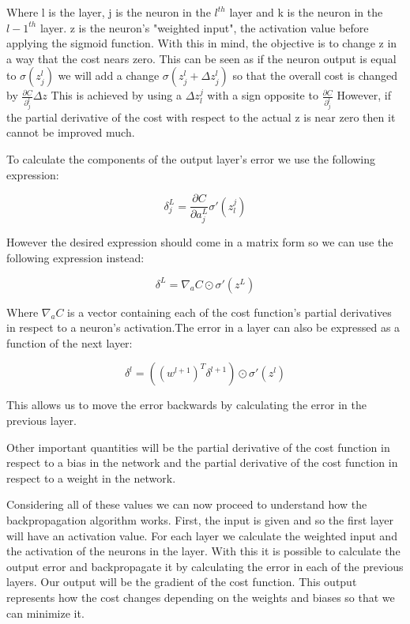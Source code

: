 \documentclass[a4paper, 12pt]{amsart}
\begin{document}
Where l is the layer, j is the neuron in the $l^{th}$ layer and k is the neuron
in the $l-1^{th}$ layer. z is the neuron's "weighted input", the activation value before applying the sigmoid function. With this in mind, the objective is to change z in a way that the cost nears zero. This can be seen as if the neuron output is equal to $\sigma(z_j^l)$  we will add a change $\sigma(z_j^l + \Delta z_j^l)$ so that the overall cost is changed by $\frac{\partial C}{\partial_j^l}\Delta z$ This is achieved by using a $\Delta z_l^j$ with a sign opposite to $\frac{\partial C}{\partial_j^l}$ However, if the partial derivative of the cost with respect to the actual z is near zero then it cannot be improved much. 

To calculate the components of the output layer's error we use the following expression:

\[\delta^L_j = \frac{\partial C}{\partial a^L_j}\sigma '(z^j_l)\]

However the desired expression should come in a matrix form so we can use the following expression instead:

\[\delta^L = \nabla_a C \odot \sigma '(z^L)\]

Where $\nabla_a C$ is a vector containing each of the cost function's partial derivatives in respect to a neuron's activation.The error in a layer can also be expressed as a function of the next layer:

\[\delta^l = ((w^{l+1})^T\delta^{l+1})\odot\sigma '(z^l)\]

This allows us to move the error backwards by calculating the error in the previous layer.

Other important quantities will be the partial derivative of the cost function in respect to a bias in the network and the partial derivative of the cost function in respect to a weight in the network. 

Considering all of these values we can now proceed to understand how the backpropagation algorithm works. First, the input is given and so the first layer will have an activation value. For each layer we calculate the weighted input and the activation of the neurons in the layer. With this it is possible to calculate the output error and backpropagate it by calculating the error in each of the previous layers. Our output will be the gradient of the cost function. This output represents how the cost changes depending on the weights and biases so that we can minimize it. 
\end{document}
